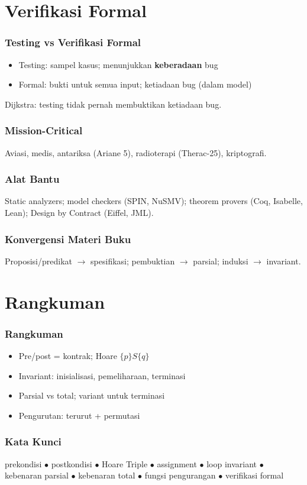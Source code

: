 \documentclass[handout]{beamer}
\theoremstyle{definition}
\theoremstyle{example}
\begin{document}
\section{Verifikasi Formal}

\begin{frame}
\frametitle{Testing vs Verifikasi Formal}
\begin{itemize}
  \item Testing: sampel kasus; menunjukkan \textbf{keberadaan} bug
  \item Formal: bukti untuk semua input; ketiadaan bug (dalam model)
\end{itemize}
Dijkstra: testing tidak pernah membuktikan ketiadaan bug.
\end{frame}

\begin{frame}
\frametitle{Mission-Critical}
Aviasi, medis, antariksa (Ariane 5), radioterapi (Therac-25), kriptografi.
\end{frame}

\begin{frame}
\frametitle{Alat Bantu}
Static analyzers; model checkers (SPIN, NuSMV); theorem provers (Coq, Isabelle, Lean); Design by Contract (Eiffel, JML).
\end{frame}

\begin{frame}
\frametitle{Konvergensi Materi Buku}
Proposisi/predikat $\to$ spesifikasi; pembuktian $\to$ parsial; induksi $\to$ invariant.
\end{frame}

\section{Rangkuman}

\begin{frame}
\frametitle{Rangkuman}
\begin{itemize}
  \item Pre/post = kontrak; Hoare $\{p\}S\{q\}$
  \item Invariant: inisialisasi, pemeliharaan, terminasi
  \item Parsial vs total; variant untuk terminasi
  \item Pengurutan: terurut + permutasi
\end{itemize}
\end{frame}

\begin{frame}
\frametitle{Kata Kunci}
\begin{center}
\small
prekondisi $\bullet$ postkondisi $\bullet$ Hoare Triple $\bullet$ assignment $\bullet$ loop invariant $\bullet$ kebenaran parsial $\bullet$ kebenaran total $\bullet$ fungsi pengurangan $\bullet$ verifikasi formal
\end{center}
\end{frame}
\end{document}
